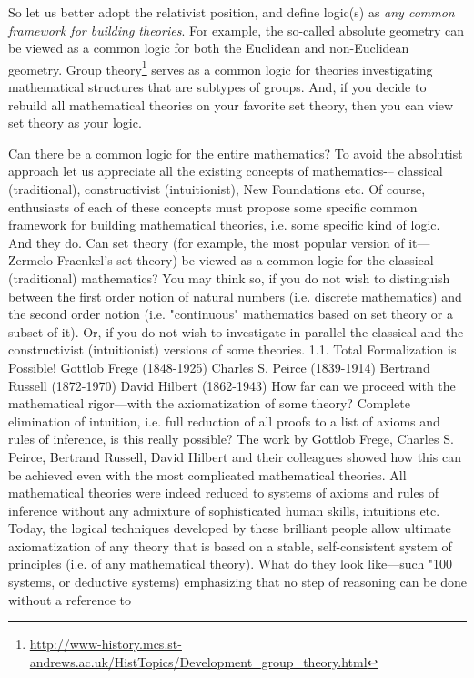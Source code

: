 So let us better adopt the relativist position, and define logic(s) as \emph{any common framework for building theories}.
For example, the so-called absolute geometry can be viewed as a common logic for both the Euclidean and non-Euclidean geometry.
Group theory\footnote{\url{http://www-history.mcs.st-andrews.ac.uk/HistTopics/Development\_group\_theory.html}} serves as a common logic for theories investigating mathematical structures that are subtypes of groups.
And, if you decide to rebuild all mathematical theories on your favorite set theory, then you can view set theory as your logic.

Can there be a common logic for the entire mathematics?
To avoid the absolutist approach let us appreciate all the existing concepts of mathematics-– classical (traditional), constructivist (intuitionist), New Foundations etc. Of course, enthusiasts of
each of these concepts must propose some specific common framework for building mathematical theories, i.e. some specific
kind of logic. And they do.
Can set theory (for example, the most popular version of it---Zermelo-Fraenkel's set theory) be viewed as a common logic for
the classical (traditional) mathematics? You may think so, if you do not wish to distinguish between the first order notion of
natural numbers (i.e. discrete mathematics) and the second order notion (i.e. "continuous" mathematics based on set theory or a
subset of it). Or, if you do not wish to investigate in parallel the classical and the constructivist (intuitionist) versions of some
theories.
1.1. Total Formalization is Possible!
Gottlob Frege (1848-1925)
Charles S. Peirce (1839-1914)
Bertrand Russell (1872-1970)
David Hilbert (1862-1943)
How far can we proceed with the mathematical rigor---with the axiomatization of some theory? Complete
elimination of intuition, i.e. full reduction of all proofs to a list of axioms and rules of inference, is this
really possible? The work by Gottlob Frege, Charles S. Peirce, Bertrand Russell, David Hilbert and their
colleagues showed how this can be achieved even with the most complicated mathematical theories. All
mathematical theories were indeed reduced to systems of axioms and rules of inference without any
admixture of sophisticated human skills, intuitions etc. Today, the logical techniques developed by these
brilliant people allow ultimate axiomatization of any theory that is based on a stable, self-consistent
system of principles (i.e. of any mathematical theory).
What do they look like---such "100%
systems, or deductive systems) emphasizing that no step of reasoning can be done without a reference to
